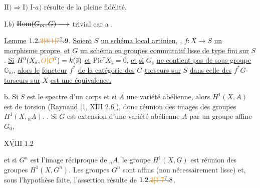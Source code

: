 $\mathrm{II})\Rightarrow\mathrm I)$ \quad $\mathrm I\text{-}a)$ résulte de la pleine fidélité.

$\mathrm I.b)$ \quad $\deleted{\mathrm{Hom}(G_m,G)\longrightarrow}$ trivial car a .


\uline{Lemme} $1.2.\deleted{\unsure{2|3|1|7}.}9$. \uline{Soient} $S$ \uline{un schéma local artinien}, , $f:X\longrightarrow S$
\uline{un morphisme propre}, \uline{et}
$G$ \uline{un schéma en groupes commutatif lisse de type fini sur} $S$.
\uline{Si} $H^0(X_{\bar s},\unsure{O|\mathcal O})=k(\bar s)$ \uline{et} $\underline{\mathrm{Pic}}^{\tau}X_{\bar s}=0$, \uline{et}
 \uline{si} $G_{\bar s}$ \uline{ne contient pas de sous-groupe} ${\mathbb G}_m$, \uline{alors le}  \uline{foncteur} $f^*$
\uline{de la catégorie des} $G$-\uline{torseurs sur} $S$ \uline{dans celle des} $f^*G$-\uline{torseurs sur} $X$
\uline{est une équivalence.}


b. \uline{Si} $S$ \uline{est le spectre d'un corps} et si $A$  une variété
abélienne, alors $H^1(X,A)$ est de torsion (Raynaud [1, $\underline{\overline{\mathrm{XIII}}}$ $2.6$]),
donc réunion des images des groupes $H^1(X,{}_nA)$. . Si $G$ est extension d'une variété
abélienne $A$ par un groupe  affine $G_0$, 


 $\underline{\overline{\mathrm{XVIII}}}$ $1.2$ 

et si $G^n$ est l'image réciproque de $ {}_nA$, le groupe $H^1(X,G)$
est réunion des groupes $H^1(X,G^n)$. Les groupes $G^n$ sont
affins (non nécessairement lisse) et, sous l'hypothèse faite,
l'assertion résulte de $1.2.\deleted{\unsure{2|1|7}.}8$.

